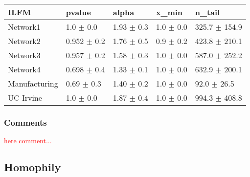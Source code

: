 \documentclass[a4paper, 12pt]{article}
\begin{document}
\begin{table}
    \begin{tabular}{lllll}
    \hline
        \textbf{ILFM} & pvalue          & alpha           & x\_min           & n\_tail              \\
    \hline
    Network1     & 1.0 $\pm$ 0.0     & 1.93 $\pm$ 0.3  & 1.0 $\pm$ 0.0     & 325.7 $\pm$ 154.9 \\
    Network2     & 0.952 $\pm$ 0.2 & 1.76 $\pm$ 0.5 & 0.9 $\pm$ 0.2 & 423.8 $\pm$ 210.1  \\
    Network3     & 0.957 $\pm$ 0.2 & 1.58 $\pm$ 0.3 & 1.0 $\pm$ 0.0     & 587.0 $\pm$ 252.2 \\
    Network4     & 0.698 $\pm$ 0.4 & 1.33 $\pm$ 0.1 & 1.0 $\pm$ 0.0     & 632.9 $\pm$ 200.1  \\
    Manufacturing & 0.69 $\pm$ 0.3   & 1.40 $\pm$ 0.2 & 1.0 $\pm$ 0.0     & 92.0 $\pm$ 26.5     \\
    UC Irvine     & 1.0 $\pm$ 0.0     & 1.87 $\pm$ 0.4   & 1.0 $\pm$ 0.0     & 994.3 $\pm$ 408.8 \\
    \hline
    \end{tabular}
\label{table:local_gof}
\end{table}

\subsubsection{Comments}

\textcolor{red}{here comment...} 

\subsection{Homophily}


\end{document}
